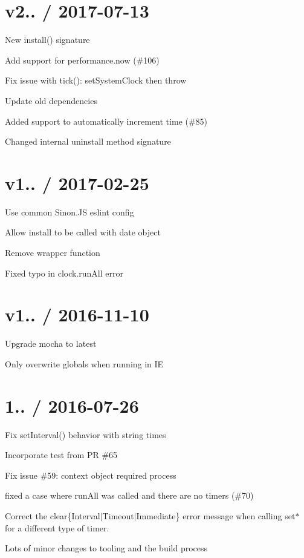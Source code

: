 \section*{v2.. / 2017-\/07-\/13 }


\begin{DoxyItemize}
\item New install() signature
\item Add support for performance.\+now (\#106)
\item Fix issue with tick()\+: set\+System\+Clock then throw
\item Update old dependencies
\item Added support to automatically increment time (\#85)
\item Changed internal uninstall method signature
\end{DoxyItemize}

\section*{v1.. / 2017-\/02-\/25 }


\begin{DoxyItemize}
\item Use common Sinon.\+JS eslint config
\item Allow install to be called with date object
\item Remove wrapper function
\item Fixed typo in clock.\+run\+All error
\end{DoxyItemize}

\section*{v1.. / 2016-\/11-\/10 }


\begin{DoxyItemize}
\item Upgrade mocha to latest
\item Only overwrite globals when running in IE
\end{DoxyItemize}

\section*{1.. / 2016-\/07-\/26 }


\begin{DoxyItemize}
\item Fix set\+Interval() behavior with string times
\item Incorporate test from PR \#65
\item Fix issue \#59\+: context object required \textquotesingle{}process\textquotesingle{}
\item fixed a case where run\+All was called and there are no timers (\#70)
\item Correct the clear\{Interval$\vert$\+Timeout$\vert$\+Immediate\} error message when calling {\ttfamily set$\ast$} for a different type of timer.
\item Lots of minor changes to tooling and the build process
\end{DoxyItemize}

